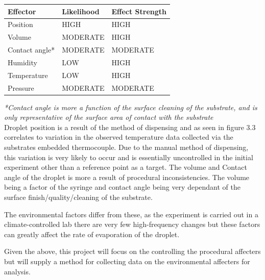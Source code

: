 \begin{table}[h]
    \centering
    \begin{tabular}{|l|l|l|}
        \hline
        \textbf{Effector} & \textbf{Likelihood} & \textbf{Effect Strength} \\ \hline
        Position          & HIGH                & HIGH                     \\ \hline
        Volume            & MODERATE            & HIGH                     \\ \hline
        Contact angle*    & MODERATE            & MODERATE                     \\ \hline
        Humidity          & LOW                 & HIGH                     \\ \hline
        Temperature       & LOW                 & HIGH                     \\ \hline
        Pressure          & MODERATE            & MODERATE                 \\ \hline
    \end{tabular}
\end{table}
\textit{\small{*Contact angle is more a function of the surface cleaning of the substrate, and is only representative of the surface area of contact with the substrate}} \\

Droplet position is a result of the method of dispensing and as seen in figure 3.3 correlates to variation in the observed temperature data collected via the substrates embedded thermocouple. Due to the manual method of dispensing, this variation is very likely to occur and is essentially uncontrolled in the initial experiment other than a reference point as a target. 
The volume and Contact angle of the droplet is more a result of procedural inconsistencies. The volume being a factor of the syringe and contact angle being very dependant of the surface finish/quality/cleaning of the substrate.

The environmental factors differ from these, as the experiment is carried out in a climate-controlled lab there are very few high-frequency changes but these factors can greatly affect the rate of evaporation of the droplet.

Given the above, this project will focus on the controlling the procedural affecters but will supply a method for collecting data on the environmental affecters for analysis.